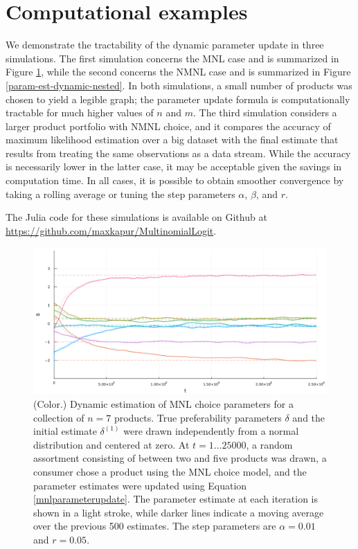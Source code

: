 \documentclass[preprint,12pt,authoryear]{elsarticle}
\begin{document}
\section{Computational examples} \label{computation}
We demonstrate the tractability of the dynamic parameter update in three simulations. The first simulation concerns the MNL case and is summarized in Figure \ref{param-est-dynamic-nonnested}, while the second concerns the NMNL case and is summarized in Figure \ref{param-est-dynamic-nested}. In both simulations, a small number of products was chosen to yield a legible graph; the parameter update formula is computationally tractable for much higher values of $n$ and $m$. The third simulation considers a larger product portfolio with NMNL choice, and it compares the accuracy of maximum likelihood estimation over a big dataset with the final estimate that results from treating the same observations as a data stream. While the accuracy is necessarily lower in the latter case, it may be acceptable given the savings in computation time. In all cases, it is possible to obtain smoother convergence by taking a rolling average or tuning the step parameters $\alpha$, $\beta$, and $r$.

The Julia code for these simulations is available on Github at \url{https://github.com/maxkapur/MultinomialLogit}. 





\begin{figure}
\begin{center}\includegraphics[width=\textwidth]{param-est-dynamic-nonnested.png}\end{center}
\captionsetup{singlelinecheck=off}
    \caption[.]{(Color.) Dynamic estimation of MNL choice parameters for a collection of $n = 7$ products. True preferability parameters $\delta$ and the initial estimate $\delta^{(1)}$ were drawn independently from a normal distribution and centered at zero. At $t = 1 \dots 25000$, a random assortment consisting of between two and five products was drawn, a consumer chose a product using the MNL choice model, and the parameter estimates were updated using Equation \ref{mnlparameterupdate}. The parameter estimate at each iteration is shown in a light stroke, while darker lines indicate a moving average over the previous 500 estimates. The step parameters are $\alpha = 0.01$ and $r = 0.05$.}
\label{param-est-dynamic-nonnested}
\end{figure}
\end{document}
